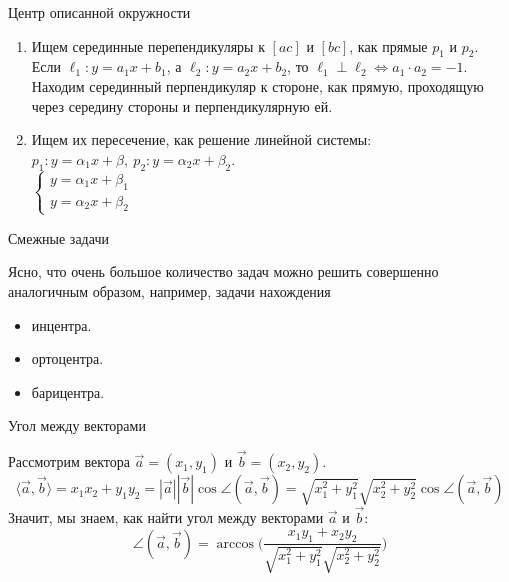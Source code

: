 \documentclass[12pt,aspectratio=169,svgnames]{beamer}
\begin{document}
\begin{frame}{Центр описанной окружности}

	\begin{enumerate}

	    \item Ищем серединные перепендикуляры к $[ac]$ и $[bc]$, как прямые $p_1$ и $p_2$.\\
			  Если $\ell_1\colon y = a_1x + b_1$, а $\ell_2\colon y = a_2 x + b_2$, то $\ell_1 \perp \ell_2 \Leftrightarrow a_1 \cdot a_2 = -1$.\\
			  Находим серединный перпендикуляр к стороне, как прямую, проходящую через середину стороны и перпендикулярную ей.

		\item Ищем их пересечение, как решение линейной системы: \\
			$p_1\colon y = \alpha_1 x + \beta, \ p_2\colon y = \alpha_2 x + \beta_2$.\\
			$\begin{cases} y = \alpha_1 x + \beta_1 \\ y = \alpha_2 x + \beta_2 \end{cases}$
	\end{enumerate}

\end{frame}

\begin{frame}{Смежные задачи}

	Ясно, что очень большое количество задач можно решить совершенно аналогичным образом, например, задачи
	нахождения

	\begin{itemize}

		\item инцентра.

		\item ортоцентра.

		\item  барицентра.
	\end{itemize}
\end{frame}

\begin{frame}{Угол между векторами}

	Рассмотрим вектора $\vec{a} = (x_1, y_1)$ и $\vec{b} = (x_2, y_2)$.
	\[ \langle \vec{a}, \vec{b} \rangle = x_1 x_2 + y_1 y_2 = |\vec{a}||\vec{b}| \cos{\angle{(\vec{a}, \vec{b})}} = \sqrt{x_1^2 + y_1^2}\sqrt{x_2^2 + y_2^2} \cos{\angle(\vec{a}, \vec{b})}\]
	Значит, мы знаем, как найти угол между векторами $\vec{a}$ и $\vec{b}$:
	\[ \angle(\vec{a}, \vec{b}) = \arccos\bigg(\frac{x_1 y_1 + x_2 y_2}{\sqrt{x_1^2 + y_1^2} \sqrt{x_2^2 + y_2^2}}\bigg) \]

\end{frame}
\end{document}
